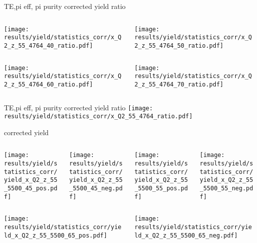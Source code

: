 \begin{frame}{TE,pi eff, pi purity corrected yield ratio}
\begin{columns}
\begin{column}[T]{0.5\textwidth}
\texttt{[image: results/yield/statistics\_corr/x\_Q2\_z\_55\_4764\_40\_ratio.pdf]}
\end{column}
\begin{column}[T]{0.5\textwidth}
\texttt{[image: results/yield/statistics\_corr/x\_Q2\_z\_55\_4764\_50\_ratio.pdf]}
\end{column}
\end{columns}
\begin{columns}
\begin{column}[T]{0.5\textwidth}
\texttt{[image: results/yield/statistics\_corr/x\_Q2\_z\_55\_4764\_60\_ratio.pdf]}
\end{column}
\begin{column}[T]{0.5\textwidth}
\texttt{[image: results/yield/statistics\_corr/x\_Q2\_z\_55\_4764\_70\_ratio.pdf]}
\end{column}
\end{columns}
\end{frame}
\begin{frame}{TE,pi eff, pi purity corrected yield ratio}
\texttt{[image: results/yield/statistics\_corr/x\_Q2\_55\_4764\_ratio.pdf]}
\end{frame}
\begin{frame}{corrected yield}
\begin{columns}
\begin{column}[T]{0.25\textwidth}
\texttt{[image: results/yield/statistics\_corr/yield\_x\_Q2\_z\_55\_5500\_45\_pos.pdf]}
\end{column}
\begin{column}[T]{0.25\textwidth}
\texttt{[image: results/yield/statistics\_corr/yield\_x\_Q2\_z\_55\_5500\_45\_neg.pdf]}
\end{column}
\begin{column}[T]{0.25\textwidth}
\texttt{[image: results/yield/statistics\_corr/yield\_x\_Q2\_z\_55\_5500\_55\_pos.pdf]}
\end{column}
\begin{column}[T]{0.25\textwidth}
\texttt{[image: results/yield/statistics\_corr/yield\_x\_Q2\_z\_55\_5500\_55\_neg.pdf]}
\end{column}
\end{columns}
\begin{columns}
\begin{column}[T]{0.25\textwidth}
\texttt{[image: results/yield/statistics\_corr/yield\_x\_Q2\_z\_55\_5500\_65\_pos.pdf]}
\end{column}
\begin{column}[T]{0.25\textwidth}
\texttt{[image: results/yield/statistics\_corr/yield\_x\_Q2\_z\_55\_5500\_65\_neg.pdf]}
\end{column}
\end{columns}
\end{frame}
